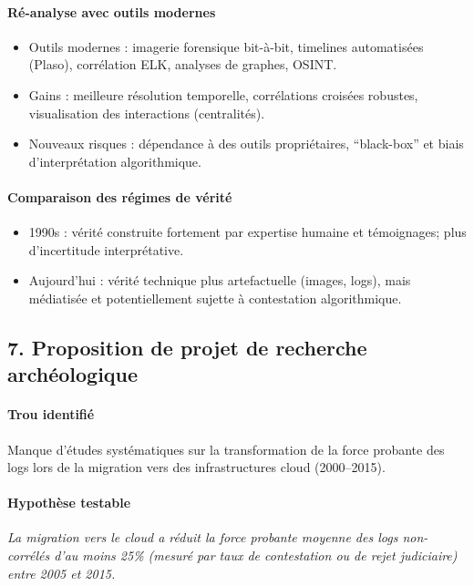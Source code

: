 \documentclass[11pt,a4paper]{article}
\begin{document}
\paragraph{Ré-analyse avec outils modernes}
\begin{itemize}[noitemsep]
  \item Outils modernes : imagerie forensique bit-à-bit, timelines automatisées (Plaso), corrélation ELK, analyses de graphes, OSINT.
  \item Gains : meilleure résolution temporelle, corrélations croisées robustes, visualisation des interactions (centralités).
  \item Nouveaux risques : dépendance à des outils propriétaires, \enquote{black-box} et biais d'interprétation algorithmique.
\end{itemize}

\paragraph{Comparaison des régimes de vérité}
\begin{itemize}[noitemsep]
  \item 1990s : vérité construite fortement par expertise humaine et témoignages; plus d'incertitude interprétative.
  \item Aujourd'hui : vérité technique plus artefactuelle (images, logs), mais médiatisée et potentiellement sujette à contestation algorithmique.
\end{itemize}

\subsection{7. Proposition de projet de recherche archéologique}
\paragraph{Trou identifié}
Manque d'études systématiques sur la transformation de la force probante des logs lors de la migration vers des infrastructures cloud (2000--2015).

\paragraph{Hypothèse testable}
\emph{La migration vers le cloud a réduit la force probante moyenne des logs non-corrélés d'au moins 25\% (mesuré par taux de contestation ou de rejet judiciaire) entre 2005 et 2015.}
\end{document}

